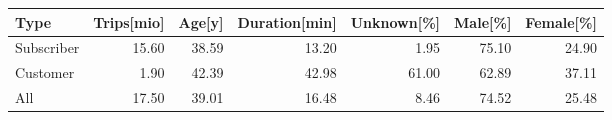 \begin{table}[ht]
\begin{myresizeenv}
\begin{tabular}{lrrrrrr}
  \toprule
Type & Trips[mio] & Age[y] & Duration[min] & Unknown[\%] & Male[\%] & Female[\%] \\ 
  \midrule
Subscriber & 15.60 & 38.59 & 13.20 & 1.95 & 75.10 & 24.90 \\ 
  Customer & 1.90 & 42.39 & 42.98 & 61.00 & 62.89 & 37.11 \\ 
   \midrule
All & 17.50 & 39.01 & 16.48 & 8.46 & 74.52 & 25.48 \\ 
   \bottomrule
\end{tabular}
\end{myresizeenv}
\end{table}
